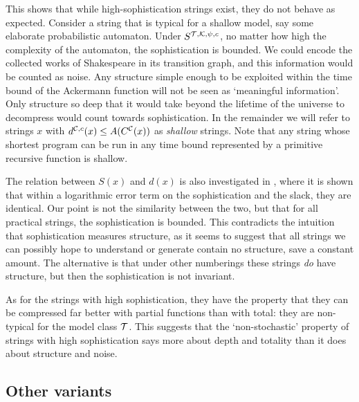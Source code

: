 \noindent This shows that while high-sophistication strings exist, they do not behave as expected. Consider a string that is typical for a shallow model, say some elaborate probabilistic automaton. Under $S^{{\cal T},{\cal K}, \psi,c}$, no matter how high the complexity of the automaton, the sophistication is bounded. We could encode the collected works of Shakespeare in its transition graph, and this information would be counted as noise. Any structure simple enough to be exploited within the time bound of the Ackermann function will not be seen as `meaningful information'. Only structure so deep that it would take beyond the lifetime of the universe to decompress would count towards sophistication. In the remainder we will refer to strings $x$ with $d^{{\cal C},c}(x) \leq A(C^{\cal C}(x))$ as \emph{shallow} strings. Note that any string whose shortest program can be run in any time bound represented by a primitive recursive function is shallow. 

The relation between $S(x)$ and $d(x)$ is also investigated in \cite{antunes2013sophistication}, where it is shown that within a logarithmic error term on the sophistication and the slack, they are identical. Our point is not the similarity between the two, but that for all practical strings, the sophistication is bounded. This contradicts the intuition that sophistication measures structure, as it seems to suggest that all strings we can possibly hope to understand or generate contain no structure, save a constant amount. The alternative is that under other numberings these strings \emph{do} have structure, but then the sophistication is not invariant.

As for the strings with high sophistication, they have the property that they can be compressed far better with partial functions than with total: they are non-typical for the model class ${\cal T}$. This suggests that the `non-stochastic' property of strings with high sophistication \cite{shen1983concept,vereshchagin2004kolmogorov} says more about depth and totality than it does about structure and noise.

\subsection{Other variants} 
\label{section:other}

